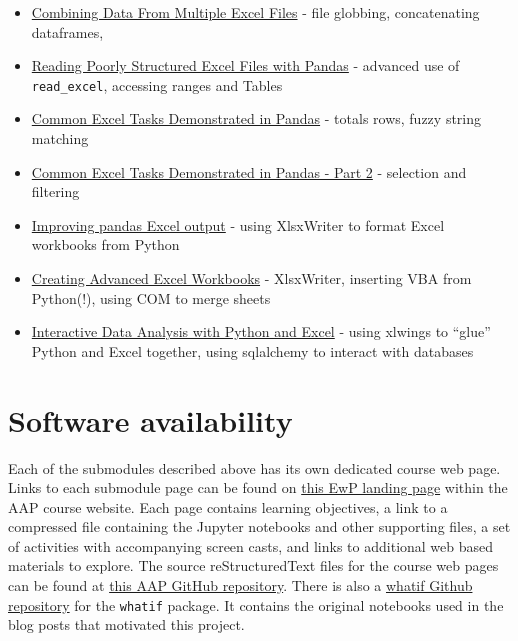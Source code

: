 \documentclass[ited,blindrev]{informs3}              %
\newcommand{\code}[1]{\texttt{#1}}
\begin{document}
\begin{itemize}
	\item
	\href{https://pbpython.com/excel-file-combine.html}{Combining Data
		From Multiple Excel Files} - file globbing, concatenating dataframes,
	\item
	\href{https://pbpython.com/pandas-excel-range.html}{Reading Poorly
		Structured Excel Files with Pandas} - advanced use of
	\texttt{read\_excel}, accessing ranges and Tables
	\item
	\href{https://pbpython.com/excel-pandas-comp.html}{Common Excel Tasks
		Demonstrated in Pandas} - totals rows, fuzzy string matching
	\item
	\href{https://pbpython.com/excel-pandas-comp-2.html}{Common Excel
		Tasks Demonstrated in Pandas - Part 2} - selection and filtering
	\item
	\href{https://pbpython.com/improve-pandas-excel-output.html}{Improving
		pandas Excel output} - using XlsxWriter to format Excel workbooks from
	Python
	\item
	\href{https://pbpython.com/advanced-excel-workbooks.html}{Creating
		Advanced Excel Workbooks} - XlsxWriter, inserting VBA from Python(!),
	using COM to merge sheets
	\item
	\href{https://pbpython.com/xlwings-pandas-excel.html}{Interactive Data
		Analysis with Python and Excel} - using xlwings to ``glue'' Python and
	Excel together, using sqlalchemy to interact with databases
\end{itemize}


\section{Software availability}
\label{sec:software}

Each of the submodules described above has its own dedicated course web page. Links to each submodule page can be found on \href{http://www.sba.oakland.edu/faculty/isken/courses/aap/mod3_excel_with_python.html}{this EwP landing page} within the AAP course website. Each page contains learning objectives, a link to a compressed file containing the Jupyter notebooks and other supporting files, a set of activities with accompanying screen casts, and links to additional web based materials to explore. The source reStructuredText files for the course web pages can be found at \href{https://github.com/misken/aap}{this AAP GitHub repository}. There is also a \href{https://github.com/misken/whatif}{whatif Github repository} for the \code{whatif} package. It contains the original notebooks used in the blog posts that motivated this project.
\end{document}

